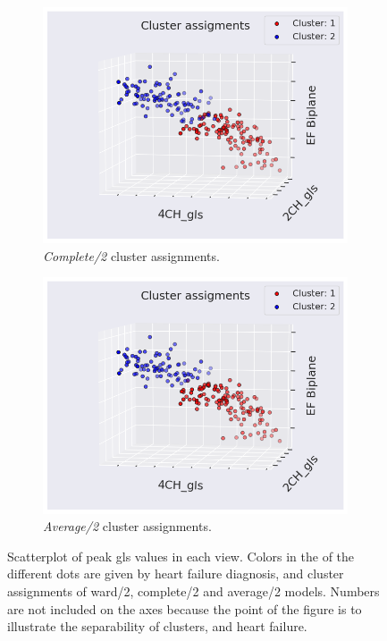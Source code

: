 \begin{figure}[htb]
    \begin{subfigure}[b]{0.49\textwidth}
        \centering
        \includegraphics[width=0.99\textwidth]{results/hf/scatter_gls_EF_complete2.png}
        \caption{\textit{Complete/2} cluster assignments.}
        \label{fig:scatter_gls_ef_complete2}
    \end{subfigure}
    \begin{subfigure}[b]{0.49\textwidth}
        \centering
        \includegraphics[width=0.99\textwidth]{results/hf/scatter_gls_EF_average2.png}
        \caption{\textit{Average/2} cluster assignments.}
        \label{fig:scatter_gls_ef_average2}
    \end{subfigure}
    \caption{Scatterplot of peak \acrshort{gls} values in each view. Colors in the of the different dots are given by heart failure diagnosis, and cluster assignments of 
             ward/2, complete/2 and average/2 models. Numbers are not included on the axes because the point of the figure is to illustrate the separability 
             of clusters, and heart failure.}
             \label{fig:scatter_gls_ef_hf_cluster_assignments}
\end{figure}

